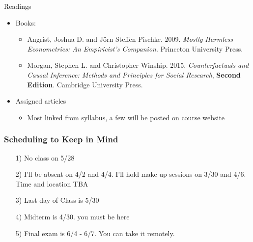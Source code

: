 \documentclass{beamer}
\numberwithin{equation}{section}
\begin{document}
\begin{frame}{Readings}
\small
\begin{itemize}
\itemsep1pt\parskip0pt
\item
  Books:

  \begin{itemize}
  \itemsep1pt\parskip0pt
 
  \item Angrist, Joshua D. and J\"orn-Steffen Pischke. 2009. \emph{Mostly Harmless Econometrics: An Empiricist's Companion}. Princeton University Press. \bigskip
  \item Morgan, Stephen L. and Christopher Winship. 2015. \emph{Counterfactuals and Causal Inference: Methods and Principles for Social Research}, \textbf{Second Edition}. Cambridge University Press. \bigskip

  \end{itemize}
\item
  Assigned articles

  \begin{itemize}
  \itemsep1pt\parskip0pt
  \item
    Most linked from syllabus, a few will be posted on course website
  \end{itemize}
\end{itemize}

\end{frame}



\begin{frame}
\frametitle{Scheduling to Keep in Mind}

\begin{itemize}
  \item[1)] No class on 5/28
  \item[2)] I'll be absent on 4/2 and 4/4.  I'll hold make up sessions on 3/30 and 4/6.  Time and location TBA
  \item[3)] Last day of Class is 5/30
  \item[4)] Midterm is 4/30.  \alert{you must be here}
  \item[5)] Final exam is 6/4 - 6/7.  You can take it remotely.  
\end{itemize}

\end{frame}
\end{document}
